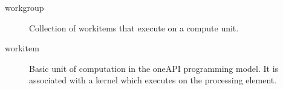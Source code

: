 \documentclass[letterpaper,10pt,english]{sphinxmanual}
\begin{document}
\begin{description}
\item[{work\sphinxhyphen{}group\label{\detokenize{glossary:term-work-group}}}] \leavevmode
Collection of work\sphinxhyphen{}items that execute on a compute unit.

\item[{work\sphinxhyphen{}item\label{\detokenize{glossary:term-work-item}}}] \leavevmode
Basic unit of computation in the oneAPI programming model. It is
associated with a kernel which executes on the processing element.

\end{description}



\renewcommand{\indexname}{Index}
\printindex
\end{document}
